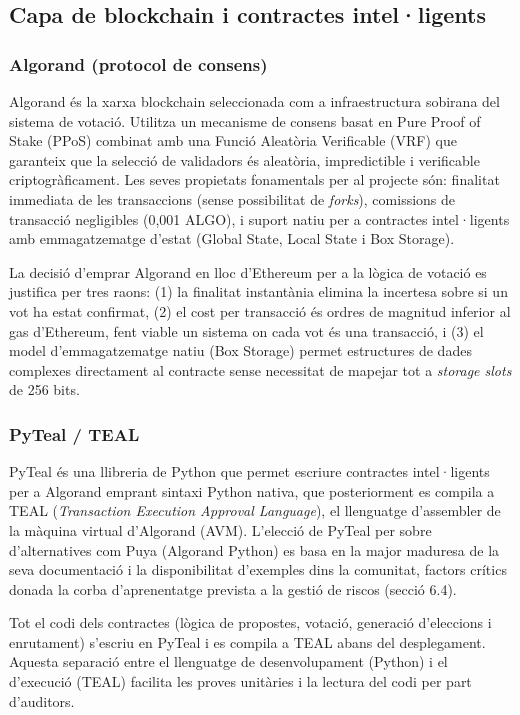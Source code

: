 \subsection{Capa de blockchain i contractes intel·ligents}
 
\subsubsection{Algorand (protocol de consens)}
 
Algorand és la xarxa blockchain seleccionada com a infraestructura sobirana del sistema de votació. Utilitza un mecanisme de consens basat en Pure Proof of Stake (PPoS) combinat amb una Funció Aleatòria Verificable (VRF) que garanteix que la selecció de validadors és aleatòria, impredictible i verificable criptogràficament. Les seves propietats fonamentals per al projecte són: finalitat immediata de les transaccions (sense possibilitat de \textit{forks}), comissions de transacció negligibles (0,001 ALGO), i suport natiu per a contractes intel·ligents amb emmagatzematge d'estat (Global State, Local State i Box Storage).
 
La decisió d'emprar Algorand en lloc d'Ethereum per a la lògica de votació es justifica per tres raons: (1) la finalitat instantània elimina la incertesa sobre si un vot ha estat confirmat, (2) el cost per transacció és ordres de magnitud inferior al gas d'Ethereum, fent viable un sistema on cada vot és una transacció, i (3) el model d'emmagatzematge natiu (Box Storage) permet estructures de dades complexes directament al contracte sense necessitat de mapejar tot a \textit{storage slots} de 256 bits.
 
\subsubsection{PyTeal / TEAL}
 
PyTeal és una llibreria de Python que permet escriure contractes intel·ligents per a Algorand emprant sintaxi Python nativa, que posteriorment es compila a TEAL (\textit{Transaction Execution Approval Language}), el llenguatge d'assembler de la màquina virtual d'Algorand (AVM). L'elecció de PyTeal per sobre d'alternatives com Puya (Algorand Python) es basa en la major maduresa de la seva documentació i la disponibilitat d'exemples dins la comunitat, factors crítics donada la corba d'aprenentatge prevista a la gestió de riscos (secció 6.4).
 
Tot el codi dels contractes (lògica de propostes, votació, generació d'eleccions i enrutament) s'escriu en PyTeal i es compila a TEAL abans del desplegament. Aquesta separació entre el llenguatge de desenvolupament (Python) i el d'execució (TEAL) facilita les proves unitàries i la lectura del codi per part d'auditors.
 
